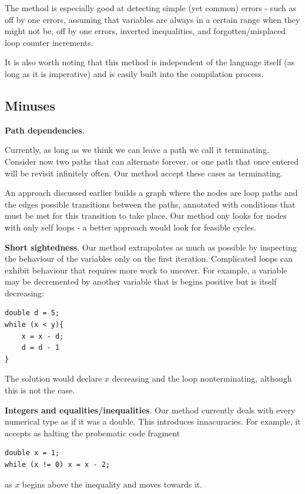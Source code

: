\documentclass[12pt,a4paper]{article}
\begin{document}
The method is especially good at detecting simple (yet common) errors - such as off by one errors, assuming that variables are always in a certain range
when they might not be, off by one errors, inverted inequalities, and forgotten/misplaced loop counter increments.

It is also worth noting that this method is independent of the language itself (as long as it is imperative) and is easily built into the compilation process.
\subsection{Minuses}

\textbf{Path dependencies}. 

Currently, as long as we think we can leave a path we call it terminating. Consider now two paths that can alternate forever, or
one path that once entered will be revisit infinitely often. Our method accept these cases as terminating.

An approach discussed earlier \citep{loopster} builds a graph where the nodes are loop paths and the edges possible transitions between the paths, annotated with
conditions that must be met for this transition to take place. Our method ony looks for nodes with only self loops - a better approach would look for feasible cycles.

\textbf{Short sightedness}. Our method extrapolates as much as possible by inspecting the behaviour of the variables only on the first iteration. Complicated loops can exhibit behaviour that requires more work to uncover. For example, a variable may be decremented by another variable that is begins positive but is itself
decreasing:

\begin{centering}
\begin{lstlisting}[language=myLang, frame=tlrb, numbers=none, label={lst:termin}]
double d = 5;
while (x < y){
	x = x - d;
	d = d - 1
}
\end{lstlisting}
\end{centering}

The solution would declare $x$ decreasing and the loop nonterminating, although this is not the case.

\textbf{Integers and equalities/inequalities}. Our method currently deals with every numerical type as if it was a double. This introduces innacuracies. For example, it accepts as halting
the probematic code fragment
\begin{centering}
\begin{lstlisting}[language=myLang, frame=tlrb, numbers=none]
double x = 1;
while (x != 0) x = x - 2;
\end{lstlisting}
\end{centering}
as $x$ begins above the inequality and moves towards it.
\end{document}

